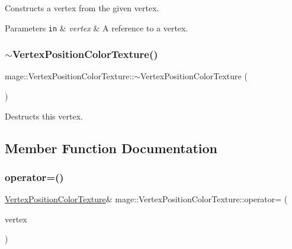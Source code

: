 Constructs a vertex from the given vertex.


\begin{DoxyParams}[1]{Parameters}
\mbox{\tt in}  & {\em vertex} & A reference to a vertex. \\
\hline
\end{DoxyParams}
\hypertarget{structmage_1_1_vertex_position_color_texture_a07cc697a88ef1a75ef64aadac9945c11}{}\label{structmage_1_1_vertex_position_color_texture_a07cc697a88ef1a75ef64aadac9945c11} 
\subsubsection{\texorpdfstring{$\sim$\+Vertex\+Position\+Color\+Texture()}{~VertexPositionColorTexture()}}
{\footnotesize\ttfamily mage\+::\+Vertex\+Position\+Color\+Texture\+::$\sim$\+Vertex\+Position\+Color\+Texture (\begin{DoxyParamCaption}{ }\end{DoxyParamCaption})\hspace{0.3cm}{\ttfamily [default]}}

Destructs this vertex. 

\subsection{Member Function Documentation}
\hypertarget{structmage_1_1_vertex_position_color_texture_a6b8d5ebc779ddf9f6e68dc83cb30fe0c}{}\label{structmage_1_1_vertex_position_color_texture_a6b8d5ebc779ddf9f6e68dc83cb30fe0c} 
\subsubsection{\texorpdfstring{operator=()}{operator=()}}
{\footnotesize\ttfamily \hyperlink{structmage_1_1_vertex_position_color_texture}{Vertex\+Position\+Color\+Texture}\& mage\+::\+Vertex\+Position\+Color\+Texture\+::operator= (\begin{DoxyParamCaption}\item[{const \hyperlink{structmage_1_1_vertex_position_color_texture}{Vertex\+Position\+Color\+Texture} \&}]{vertex }\end{DoxyParamCaption})\hspace{0.3cm}{\ttfamily [default]}}

